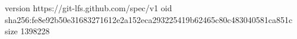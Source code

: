 version https://git-lfs.github.com/spec/v1
oid sha256:fe8e92b50e31683271612e2a152eca293225419b62465c80c483040581ca851c
size 1398228
